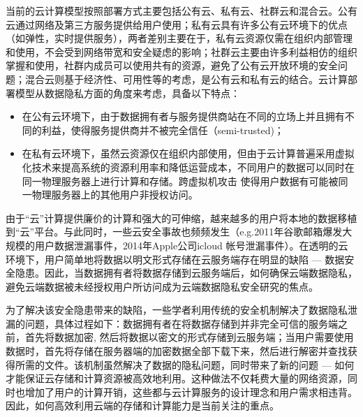  当前的云计算模型按照部署方式主要包括公有云、私有云、社群云和混合云。公有云通过网络及第三方服务提供给用户使用；私有云具有许多公有云环境下的优点（如弹性，实时提供服务），两者差别主要在于，私有云资源仅需在组织内部管理和使用，不会受到网络带宽和安全疑虑的影响；社群云主要由许多利益相仿的组织掌握和使用，社群内成员可以使用共有的资源，避免了公有云开放环境的安全问题；混合云则基于经济性、可用性等的考虑，是公有云和私有云的结合。云计算部署模型从数据隐私方面的角度来考虑，具备以下特点：
 \begin{itemize}
   \item
   在公有云环境下，由于数据拥有者与服务提供商站在不同的立场上并且拥有不同的利益，使得服务提供商并不被完全信任（semi-trusted)；

   \item
   在私有云环境下，虽然云资源仅在组织内部使用，但由于云计算普遍采用虚拟化技术\cite{chiueh2005survey}来提高系统的资源利用率和降低运营成本，不同用户的数据可以同时在同一物理服务器上进行计算和存储。跨虚拟机攻击\cite{ristenpart2009hey} 使得用户数据有可能被同一物理服务器上的其他用户非授权访问。

 \end{itemize}

 由于“云”计算提供廉价的计算和强大的可伸缩，越来越多的用户将本地的数据移植到“云”平台。与此同时，一些云安全事故也频频发生（e.g.2011年谷歌邮箱爆发大规模的用户数据泄漏事件，2014年Apple公司icloud 帐号泄漏事件）。在透明的云环境下，用户简单地将数据以明文形式存储在云服务端存在明显的缺陷 --- 数据安全隐患。因此，当数据拥有者将数据存储到云服务端后，如何确保云端数据隐私，避免云端数据被未经授权用户所访问成为云端数据隐私安全研究的焦点。



为了解决该安全隐患带来的缺陷，一些学者利用传统的安全机制解决了数据隐私泄漏的问题，具体过程如下：数据拥有者在将数据存储到并非完全可信的服务端之前，首先将数据加密\cite{biham1993differential}, 然后将数据以密文的形式存储到云服务端；当用户需要使用数据时，首先将存储在服务器端的加密数据全部下载下来，然后进行解密并查找获得所需的文件。该机制虽然解决了数据的隐私问题，同时带来了新的问题 --- 如何才能保证云存储和计算资源被高效地利用。这种做法不仅耗费大量的网络资源，同时也增加了用户的计算开销，这些都与云计算服务的设计理念和用户需求相违背。因此，如何高效利用云端的存储和计算能力是当前关注的重点。

